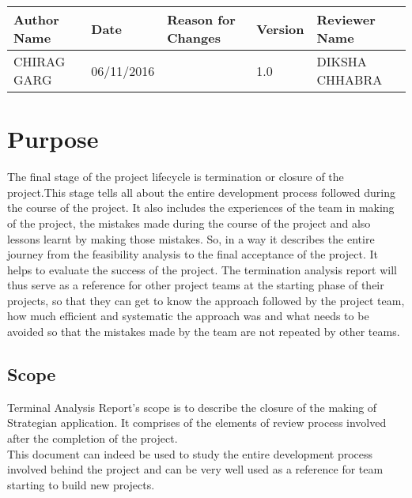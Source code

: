 \documentclass{article}
\begin{document}
\begin{center}

\begin{tabular}{|p{4cm}|p{2cm}|p{3cm}|p{1cm}|p{3cm}|}
    \hline Author Name&Date&Reason for Changes&Version&Reviewer Name\\ \hline
    CHIRAG GARG &06/11/2016 & &1.0&DIKSHA CHHABRA  \\\hline
    
\end{tabular}
\end{center}
\newpage


\tableofcontents
\newpage
\section{ Purpose}

The final stage of the project lifecycle is termination or closure of the project.This stage tells all about the entire development process followed during the course of the project. It also includes the experiences of the team in making of the project, the mistakes made during the course of the project and also lessons learnt by making those mistakes. So, in a way it describes the entire journey from the feasibility analysis to the final acceptance of the project. It helps to evaluate the success of the project. The termination analysis report will thus serve as a reference for other project teams at the starting phase of their projects, so that they can get to know the approach followed by the project team, how much efficient and systematic the approach was and what needs to be avoided so that the mistakes made by the team are not repeated by other teams.
\subsection{Scope}
Terminal Analysis Report’s scope is to describe the closure of the making of
Strategian application. It comprises of the elements of review process involved after the completion of the project.\\
This document can indeed be used to study the entire development process
involved behind the project and can be very well used as a reference for team starting to build new projects.


\end{document}
